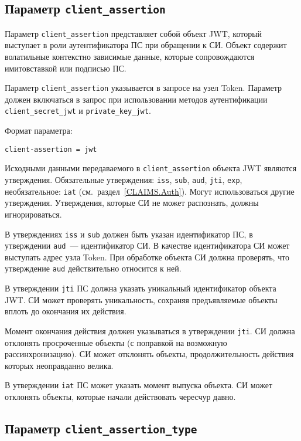\subsection{Параметр \lstinline{client_assertion}}
\label{PARAMS.ClientAssertion}

Параметр \lstinline{client_assertion} представляет собой объект JWT, 
который выступает в роли аутентификатора ПС при обращении к СИ.
%
Объект содержит волатильные контекстно зависимые данные, которые сопровождаются 
имитовставкой или подписью ПС. 

Параметр \lstinline{client_assertion} указывается в запросе на узел Token.
%
Параметр должен включаться в запрос при использовании методов аутентификации 
\lstinline{client_secret_jwt} и \lstinline{private_key_jwt}.

Формат параметра:
\begin{lstlisting}
client-assertion = jwt
\end{lstlisting}

Исходными данными передаваемого в \lstinline{client_assertion} объекта JWT 
являются утверждения. Обязательные утверждения:
\lstinline{iss}, \lstinline{sub}, \lstinline{aud}, \lstinline{jti}, 
\lstinline{exp}, 
необязательное: \lstinline{iat} (см.~раздел~\ref{CLAIMS.Auth}).
%
Могут использоваться другие утверждения. Утверждения, которые СИ не может 
распознать, должны игнорироваться.

В утверждениях \lstinline{iss} и \lstinline{sub} должен быть указан
идентификатор ПС, в утверждении \lstinline{aud}~--- идентификатор СИ.
В качестве идентификатора СИ может выступать адрес узла Token. При обработке 
объекта СИ должна проверять, что утверждение \lstinline{aud} действительно 
относится к ней.

В утверждении \lstinline{jti} ПС должна указать уникальный идентификатор 
объекта JWT. СИ может проверять уникальность, сохраняя предъявляемые объекты 
вплоть до окончания их действия.

Момент окончания действия должен указываться в утверждении \lstinline{jti}. 
СИ должна отклонять просроченные объекты (с поправкой на возможную 
рассинхронизацию). 
%
СИ может отклонять объекты, продолжительность действия которых неоправданно 
велика.

В утверждении \lstinline{iat} ПС может указать момент выпуска объекта. 
%
СИ может отклонять объекты, которые начали действовать чересчур давно.

\subsection{Параметр \lstinline{client_assertion_type}}
\label{PARAMS.ClientAssertionType} 

